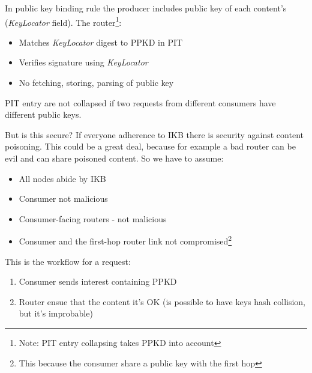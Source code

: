 In public key binding rule the producer includes public key of each content's
(\textit{KeyLocator} field). The router\footnote{Note: PIT entry collapsing
takes PPKD into account}:
\begin{itemize}
  \item Matches \textit{KeyLocator} digest to PPKD in PIT
  \item Verifies signature using \textit{KeyLocator}
  \item No fetching, storing, parsing of public key
\end{itemize}

PIT entry are not collapsed if two requests from different consumers have
different public keys.

But is this secure? If everyone adherence to IKB there is security against
content poisoning. This could be a great deal, because for example a bad router
can be evil and can share poisoned content. So we have to assume:
\begin{itemize}
  \item All nodes abide by IKB
  \item Consumer not malicious
  \item Consumer-facing routers - not malicious
  \item Consumer and the first-hop router link not compromised\footnote{This
because the consumer share a public key with the first hop}
\end{itemize}

This is the workflow for a request:
\begin{enumerate}
  \item Consumer sends interest containing PPKD
  \item Router ensue that the content it's OK (is possible to have keys hash
collision, but it's improbable)
\end{enumerate}

